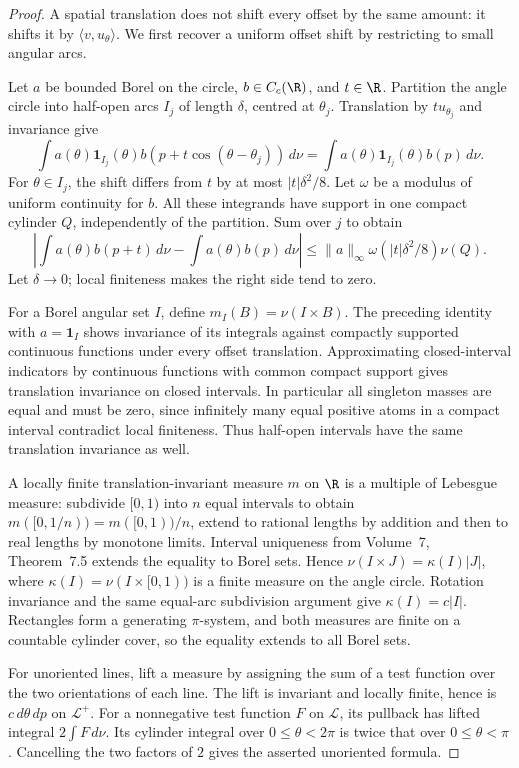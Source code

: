 \begin{proof}
A spatial translation does not shift every offset by the same amount: it shifts it by $\langle v,u_\theta\rangle$. We first recover a uniform offset shift by restricting to small angular arcs.

Let $a$ be bounded Borel on the circle, $b\in C_c(\R)$, and $t\in\R$. Partition the angle circle into half-open arcs $I_j$ of length $\delta$, centred at $\theta_j$. Translation by $tu_{\theta_j}$ and invariance give
\[
\int a(\theta)\mathbf1_{I_j}(\theta)b(p+t\cos(\theta-\theta_j))\,d\nu
=\int a(\theta)\mathbf1_{I_j}(\theta)b(p)\,d\nu.
\]
For $\theta\in I_j$, the shift differs from $t$ by at most $|t|\delta^2/8$. Let $\omega$ be a modulus of uniform continuity for $b$. All these integrands have support in one compact cylinder $Q$, independently of the partition. Sum over $j$ to obtain
\[
\left|\int a(\theta)b(p+t)\,d\nu-\int a(\theta)b(p)\,d\nu\right|
\le\|a\|_\infty\omega(|t|\delta^2/8)\nu(Q).
\]
Let $\delta\to0$; local finiteness makes the right side tend to zero.

For a Borel angular set $I$, define $m_I(B)=\nu(I\times B)$. The preceding identity with $a=\mathbf1_I$ shows invariance of its integrals against compactly supported continuous functions under every offset translation. Approximating closed-interval indicators by continuous functions with common compact support gives translation invariance on closed intervals. In particular all singleton masses are equal and must be zero, since infinitely many equal positive atoms in a compact interval contradict local finiteness. Thus half-open intervals have the same translation invariance as well.

A locally finite translation-invariant measure $m$ on $\R$ is a multiple of Lebesgue measure: subdivide $[0,1)$ into $n$ equal intervals to obtain $m([0,1/n))=m([0,1))/n$, extend to rational lengths by addition and then to real lengths by monotone limits. Interval uniqueness from Volume~7, Theorem~7.5 extends the equality to Borel sets. Hence $\nu(I\times J)=\kappa(I)|J|$, where $\kappa(I)=\nu(I\times[0,1))$ is a finite measure on the angle circle. Rotation invariance and the same equal-arc subdivision argument give $\kappa(I)=c|I|$. Rectangles form a generating $\pi$-system, and both measures are finite on a countable cylinder cover, so the equality extends to all Borel sets.

For unoriented lines, lift a measure by assigning the sum of a test function over the two orientations of each line. The lift is invariant and locally finite, hence is $c\,d\theta\,dp$ on $\mathcal L^+$. For a nonnegative test function $F$ on $\mathcal L$, its pullback has lifted integral $2\int F\,d\nu$. Its cylinder integral over $0\le\theta<2\pi$ is twice that over $0\le\theta<\pi$. Cancelling the two factors of $2$ gives the asserted unoriented formula.
\end{proof}

